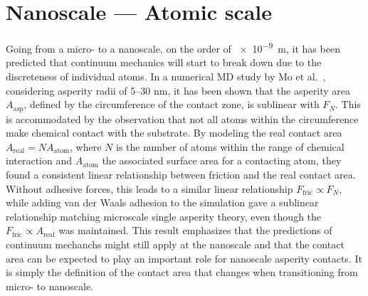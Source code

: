 









%
\section{Nanoscale --- Atomic scale}\label{sec:nanoscale}
Going from a micro- to a nanoscale, on the order of \SI{e-9}{m}, it has been
predicted that continuum mechanics will start to break down
\cite{luan_breakdown_2005} due to the discreteness of individual atoms. In a
numerical \acrshort{MD} study by Mo et al.\ \cite{mo_friction_2009}, considering
asperity radii of 5--30 nm, it has been shown that the asperity area
$A_{\text{asp}}$, defined by the circumference of the contact zone, is
sublinear with $F_N$. This is accommodated by the observation that not all atoms
within the circumference make chemical contact with the substrate. By modeling
the real contact area $A_{\text{real}} = NA_{\text{atom}}$, where $N$ is the
number of atoms within the range of chemical interaction and $A_{\text{atom}}$
the associated surface area for a contacting atom, they found a consistent linear relationship between friction and the real contact area. Without adhesive
forces, this leads to a similar linear relationship $F_{\text{fric}} \propto F_N$,
while adding van der Waals adhesion to the simulation gave a sublinear
relationship matching microscale single asperity theory, even though the
$F_{\text{fric}} \propto A_{\text{real}}$ was maintained. This result emphasizes
that the predictions of continuum mechanchs might still apply at the nanoscale
and that the contact area can be expected to play an important role for
nanoscale asperity contacts. It is simply the definition of the contact area that
changes when transitioning from micro- to nanoscale. 


